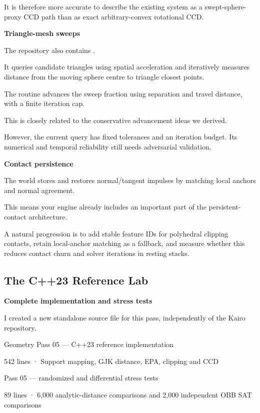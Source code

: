 It is therefore more accurate to describe the existing system as a swept-sphere-proxy CCD path than as exact arbitrary-convex rotational CCD.

\textbf{Triangle-mesh sweeps}

The repository also contains .

It queries candidate triangles using spatial acceleration and iteratively measures distance from the moving sphere centre to triangle closest points.

The routine advances the sweep fraction using separation and travel distance, with a finite iteration cap.

This is closely related to the conservative advancement ideas we derived.

However, the current query has fixed tolerances and an iteration budget. Its numerical and temporal reliability still needs adversarial validation.

\textbf{Contact persistence}

The world stores and restores normal/tangent impulses by matching local anchors and normal agreement.

This means your engine already includes an important part of the persistent-contact architecture.

A natural progression is to add stable feature IDs for polyhedral clipping contacts, retain local-anchor matching as a fallback, and measure whether this reduces contact churn and solver iterations in resting stacks.

\subsection{The C++23 Reference Lab}\label{04-visual-computing-ii-ch026-the-c23-reference-lab}

\hypertarget{04-visual-computing-ii-ch026-the-c23-reference-lab}{}

\textbf{Complete implementation and stress tests}

I created a new standalone source file for this pass, independently of the Kairo repository.

Geometry Pass 05 --- C++23 reference implementation

542 lines · Support mapping, GJK distance, EPA, clipping and CCD

Pass 05 --- randomized and differential stress tests

89 lines · 6,000 analytic-distance comparisons and 2,000 independent OBB SAT comparisons

